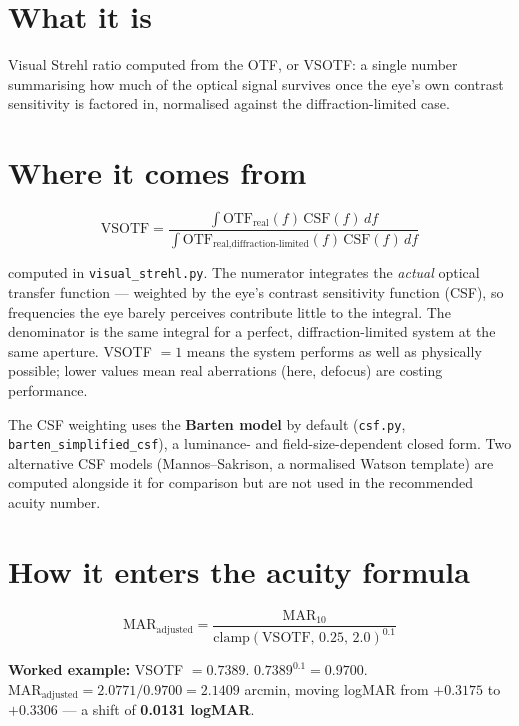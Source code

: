 \documentclass[11pt]{report}
\begin{document}
\section{What it is}

Visual Strehl ratio computed from the OTF, or VSOTF: a single number summarising how much of the
optical signal survives once the eye's own contrast sensitivity is factored in, normalised against
the diffraction-limited case.

\section{Where it comes from}

\begin{equation}
\text{VSOTF} = \frac{\int \text{OTF}_{\text{real}}(f)\,\text{CSF}(f)\,df}
{\int \text{OTF}_{\text{real,diffraction-limited}}(f)\,\text{CSF}(f)\,df}
\end{equation}

computed in \texttt{visual\_strehl.py}. The numerator integrates the \emph{actual} optical transfer
function --- weighted by the eye's contrast sensitivity function (CSF), so frequencies the eye barely
perceives contribute little to the integral. The denominator is the same integral for a perfect,
diffraction-limited system at the same aperture. VSOTF $=1$ means the system performs as well as
physically possible; lower values mean real aberrations (here, defocus) are costing performance.

The CSF weighting uses the \textbf{Barten model} by default (\texttt{csf.py},
\texttt{barten\_simplified\_csf}), a luminance- and field-size-dependent closed form. Two alternative
CSF models (Mannos--Sakrison, a normalised Watson template) are computed alongside it for
comparison but are not used in the recommended acuity number.

\section{How it enters the acuity formula}

\begin{equation}
\text{MAR}_{\text{adjusted}} = \frac{\text{MAR}_{10}}{\text{clamp}(\text{VSOTF},\,0.25,\,2.0)^{0.1}}
\end{equation}

\textbf{Worked example:} VSOTF $=0.7389$. $0.7389^{0.1} = 0.9700$. $\text{MAR}_{\text{adjusted}} =
2.0771 / 0.9700 = 2.1409$ arcmin, moving logMAR from $+0.3175$ to $+0.3306$ --- a shift of
\textbf{0.0131 logMAR}.
\end{document}
